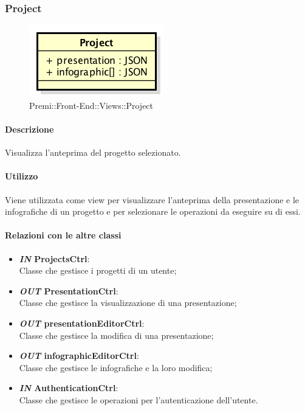 	
\subsubsection{Project}
	\begin{figure}[h]
		\centering
		\includegraphics[width=0.3\linewidth]{img/premi_front_end_views_project}
		\caption[Premi::Front-End::Views::Project]{Premi::Front-End::Views::Project}
	\end{figure}
	
	\paragraph{Descrizione}
	Visualizza l'anteprima del progetto selezionato.
	
	\paragraph{Utilizzo}
	Viene utilizzata come view per visualizzare l'anteprima della presentazione e le infografiche di un progetto e per selezionare le operazioni da eseguire su di essi.
	
	\paragraph{Relazioni con le altre classi}
	\begin{itemize}
		\item \textbf{\textit{IN} ProjectsCtrl}:\\
			Classe che gestisce i progetti di un utente;
		\item \textbf{\textit{OUT} PresentationCtrl}:\\
			Classe che gestisce la visualizzazione di una presentazione;
		\item \textbf{\textit{OUT} presentationEditorCtrl}:\\
			Classe che gestisce la modifica di una presentazione;
		\item \textbf{\textit{OUT} infographicEditorCtrl}:\\
			Classe che gestisce le infografiche e la loro modifica;
		\item \textbf{\textit{IN} AuthenticationCtrl}:\\
			Classe che gestisce le operazioni per l'autenticazione dell'utente.
	\end{itemize}
	
